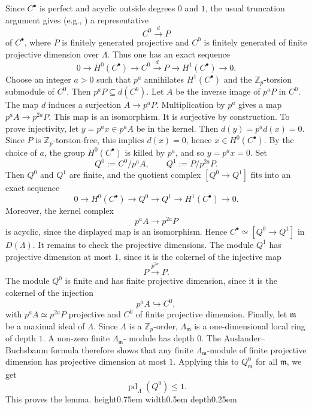 \documentclass[a4paper,11pt]{article}
\newenvironment{proof}[1][Proof]{\begin{trivlist}
\item[\hskip \labelsep {\bfseries #1}]}{\end{trivlist}}
\newcommand{\qed}{\nobreak \ifvmode \relax \else
    \ifdim\lastskip<1.5em \hskip-\lastskip
     \hskip1.5em plus0em minus0.5em \fi \nobreak
      \vrule height0.75em width0.5em depth0.25em\fi}
\begin{document}
\begin{proof}
Since \(C^{\bullet}\) is perfect and acyclic outside degrees \(0\) and \(1\),
the usual truncation argument gives (e.g., \cite[\S 3]{Burns00}) a representative
\[
C^0
\stackrel{d}{\longrightarrow}
P
\]
of \(C^{\bullet}\), where \(P\) is finitely generated projective and \(C^0\)
is finitely generated of finite projective dimension over \(\Lambda\). Thus one
has an exact sequence
\[
0
\longrightarrow
H^0(C^{\bullet})
\longrightarrow
C^0
\stackrel{d}{\longrightarrow}
P
\longrightarrow
H^1(C^{\bullet})
\longrightarrow
0.
\]
Choose an integer \(a>0\) such that \(p^a\) annihilates
\(H^1(C^{\bullet})\) and the \(\mathbb Z_p\)-torsion submodule of \(C^0\).
Then \(p^aP\subseteq d(C^0)\). Let \(A\) be the inverse image of \(p^aP\) in
\(C^0\). The map \(d\) induces a surjection
\(
A\longrightarrow p^aP.
\)
Multiplication by \(p^a\) gives a map
\(
p^aA\longrightarrow p^{2a}P.
\)
This map is an isomorphism. It is surjective by construction. To prove
injectivity, let \(y=p^ax\in p^aA\) be in the kernel. Then
\(d(y)=p^ad(x)=0\). Since \(P\) is \(\mathbb Z_p\)-torsion-free, this implies
\(d(x)=0\), hence \(x\in H^0(C^{\bullet})\). By the choice of \(a\), the group
\(H^0(C^{\bullet})\) is killed by \(p^a\), and so \(y=p^ax=0\).
Set
\[
Q^0:=C^0/p^aA,
\qquad
Q^1:=P/p^{2a}P.
\]
Then \(Q^0\) and \(Q^1\) are finite, and the quotient complex
\(
[Q^0
\longrightarrow
Q^1]
\)
fits into an exact sequence
\[
0
\longrightarrow
H^0(C^{\bullet})
\longrightarrow
Q^0
\longrightarrow
Q^1
\longrightarrow
H^1(C^{\bullet})
\longrightarrow
0.
\]
Moreover, the kernel complex
\[
p^aA
\longrightarrow
p^{2a}P
\]
is acyclic, since the displayed map is an isomorphism. Hence
\(
C^{\bullet}\simeq [Q^0\to Q^1]
\)
in \(D(\Lambda)\).
It remains to check the projective dimensions. The module \(Q^1\) has
projective dimension at most \(1\), since it is the cokernel of the injective
map
\[
P
\stackrel{p^{2a}}{\longrightarrow}
P.
\]
The module \(Q^0\) is finite and has finite projective dimension, since it is
the cokernel of the injection
\[
p^aA\hookrightarrow C^0,
\]
with \(p^aA\simeq p^{2a}P\) projective and \(C^0\) of finite projective
dimension.
Finally, let \(\mathfrak m\) be a maximal ideal of \(\Lambda\). Since
\(\Lambda\) is a \(\mathbb Z_p\)-order, \(\Lambda_{\mathfrak m}\) is a
one-dimensional local ring of depth \(1\). A non-zero finite \(\Lambda_{\mathfrak m}\)-
module has depth \(0\). The Auslander--Buchsbaum formula therefore shows that
any finite \(\Lambda_{\mathfrak m}\)-module of finite projective dimension has
projective dimension at most \(1\). Applying this to \(Q^0_{\mathfrak m}\) for
all \(\mathfrak m\), we get
\[
\operatorname{pd}_{\Lambda}(Q^0)\leq 1.
\]
This proves the lemma.\qed
\end{proof}
\end{document}
